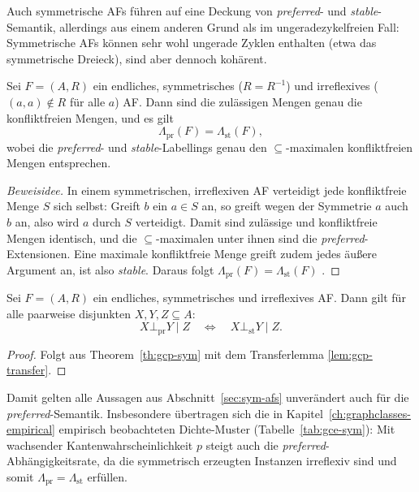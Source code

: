 Auch symmetrische AFs f\"uhren auf eine Deckung von \textit{preferred}- und
\textit{stable}-Semantik, allerdings aus einem anderen Grund als im
ungeradezykelfreien Fall: Symmetrische AFs k\"onnen sehr wohl ungerade Zyklen
enthalten (etwa das symmetrische Dreieck), sind aber dennoch koh\"arent.

\begin{Theorem}
    \label{th:gcp-sym}
    Sei \(F=(A,R)\) ein endliches, symmetrisches (\(R=R^{-1}\)) und
    irreflexives (\((a,a)\notin R\) f\"ur alle \(a\)) AF. Dann sind die
    zul\"assigen Mengen genau die konfliktfreien Mengen, und es gilt
    \[
        \Lambda_{\mathrm{pr}}(F)=\Lambda_{\mathrm{st}}(F),
    \]
    wobei die \textit{preferred}- und \textit{stable}-Labellings genau den
    \(\subseteq\)-maximalen konfliktfreien Mengen entsprechen.
\end{Theorem}

\begin{proof}[Beweisidee]
    In einem symmetrischen, irreflexiven AF verteidigt jede konfliktfreie Menge
    \(S\) sich selbst: Greift \(b\) ein \(a\in S\) an, so greift wegen der
    Symmetrie \(a\) auch \(b\) an, also wird \(a\) durch \(S\) verteidigt.
    Damit sind zul\"assige und konfliktfreie Mengen identisch, und die
    \(\subseteq\)-maximalen unter ihnen sind die \textit{preferred}-Extensionen.
    Eine maximale konfliktfreie Menge greift zudem jedes \"au\ss ere Argument an,
    ist also \textit{stable}. Daraus folgt
    \(\Lambda_{\mathrm{pr}}(F)=\Lambda_{\mathrm{st}}(F)\)
    \cite{handbook__of_formal_argumentation__vol__3:2024}.
\end{proof}

\begin{Corollary}
    \label{cor:gcp-sym-transfer}
    Sei \(F=(A,R)\) ein endliches, symmetrisches und irreflexives AF. Dann gilt
    f\"ur alle paarweise disjunkten \(X,Y,Z\subseteq A\):
    \[
        X\bot_{\mathrm{pr}}Y\mid Z
        \quad\Longleftrightarrow\quad
        X\bot_{\mathrm{st}}Y\mid Z.
    \]
\end{Corollary}

\begin{proof}
    Folgt aus Theorem~\ref{th:gcp-sym} mit dem Transferlemma
    \ref{lem:gcp-transfer}.
\end{proof}

Damit gelten alle Aussagen aus Abschnitt~\ref{sec:sym-afs} unver\"andert auch
f\"ur die \textit{preferred}-Semantik. Insbesondere \"ubertragen sich die in
Kapitel~\ref{ch:graphclasses-empirical} empirisch beobachteten Dichte-Muster
(Tabelle~\ref{tab:gce-sym}): Mit wachsender Kantenwahrscheinlichkeit \(p\)
steigt auch die \textit{preferred}-Abh\"angigkeitsrate, da die symmetrisch
erzeugten Instanzen irreflexiv sind und somit
\(\Lambda_{\mathrm{pr}}=\Lambda_{\mathrm{st}}\) erf\"ullen.

